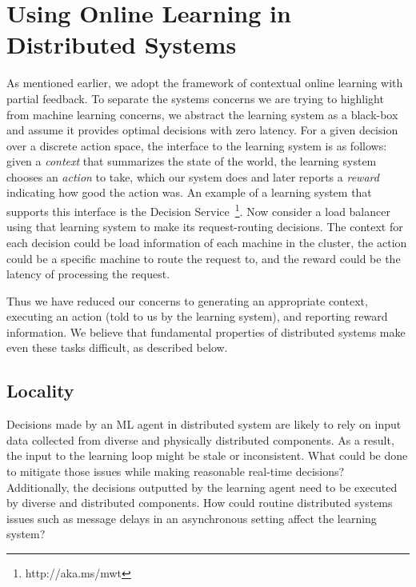 \documentclass[a4paper,twocolumn]{article}
\begin{document}
\section{Using Online Learning in Distributed Systems}

As mentioned earlier, we adopt the framework of contextual online learning with
partial feedback.  To separate the systems concerns we are trying to highlight
from machine learning concerns, we abstract the learning system as a black-box
and assume it provides optimal decisions with zero latency. For a given decision
over a discrete action space, the interface to the learning system is as
follows: given a {\em context} that summarizes the state of the world, the
learning system chooses an {\em action} to take, which our system does and later
reports a {\em reward} indicating how good the action was. An example of a
learning system that supports this interface is the Decision
Service~\footnote{http://aka.ms/mwt}. Now consider a load balancer using that
learning system to make its request-routing decisions. The context for each
decision could be load information of each machine in the cluster, the action
could be a specific machine to route the request to, and the reward could be the
latency of processing the request.

Thus we have reduced our concerns to generating an appropriate context,
executing an action (told to us by the learning system), and reporting reward
information.  We believe that fundamental properties of distributed systems make
even these tasks difficult, as described below.

\subsection*{Locality}

Decisions made by an ML agent in distributed system are likely to rely on input
data collected from diverse and physically distributed components. As a result,
the input to the learning loop might be stale or inconsistent. What could be
done to mitigate those issues while making reasonable real-time decisions?
Additionally, the decisions outputted by the learning agent need to be executed
by diverse and distributed components. How could routine distributed systems
issues such as message delays in an asynchronous setting affect the learning
system?
\end{document}
